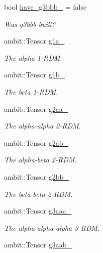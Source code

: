 \begin{DoxyCompactItemize}
bool \mbox{\hyperlink{classforte_1_1_r_d_ms_af4f6f739c7760b96cb8f0f6bb9d265bd}{have\+\_\+g3bbb\+\_\+}} = false
\begin{DoxyCompactList}\small\item\em Was g3bbb built? \end{DoxyCompactList}\item 
ambit\+::\+Tensor \mbox{\hyperlink{classforte_1_1_r_d_ms_af227a87cddd7ef6a1acfee7c797ee6bd}{g1a\+\_\+}}
\begin{DoxyCompactList}\small\item\em The alpha 1-\/\+R\+DM. \end{DoxyCompactList}\item 
ambit\+::\+Tensor \mbox{\hyperlink{classforte_1_1_r_d_ms_a1094c70dd7005e203c9fe1e990485750}{g1b\+\_\+}}
\begin{DoxyCompactList}\small\item\em The beta 1-\/\+R\+DM. \end{DoxyCompactList}\item 
ambit\+::\+Tensor \mbox{\hyperlink{classforte_1_1_r_d_ms_a50ba2715af40ed13b959ede88f0d0189}{g2aa\+\_\+}}
\begin{DoxyCompactList}\small\item\em The alpha-\/alpha 2-\/\+R\+DM. \end{DoxyCompactList}\item 
ambit\+::\+Tensor \mbox{\hyperlink{classforte_1_1_r_d_ms_ad31aa862a41391942d9cca7cb6c08859}{g2ab\+\_\+}}
\begin{DoxyCompactList}\small\item\em The alpha-\/beta 2-\/\+R\+DM. \end{DoxyCompactList}\item 
ambit\+::\+Tensor \mbox{\hyperlink{classforte_1_1_r_d_ms_a5d0f8e296be329f256348b55185303fd}{g2bb\+\_\+}}
\begin{DoxyCompactList}\small\item\em The beta-\/beta 2-\/\+R\+DM. \end{DoxyCompactList}\item 
ambit\+::\+Tensor \mbox{\hyperlink{classforte_1_1_r_d_ms_a11bc5da966ed2934a1f1635adb45b8e9}{g3aaa\+\_\+}}
\begin{DoxyCompactList}\small\item\em The alpha-\/alpha-\/alpha 3-\/\+R\+DM. \end{DoxyCompactList}\item 
ambit\+::\+Tensor \mbox{\hyperlink{classforte_1_1_r_d_ms_a0fd401d341f7dd7ac36fef4164043278}{g3aab\+\_\+}}

\end{DoxyCompactItemize}
